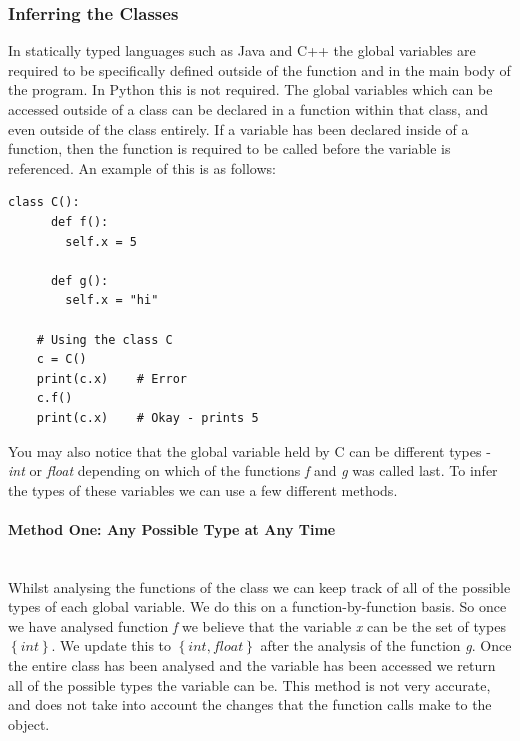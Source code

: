 \documentclass[12pt, titlepage]{article}
\begin{document}
\subsubsection{Inferring the Classes}
In statically typed languages such as Java and C++ the global variables are required to be specifically defined outside of the function and in the main body of the program. In Python this is not required. The global variables which can be accessed outside of a class can be declared in a function within that class, and even outside of the class entirely. If a variable has been declared inside of a function, then the function is required to be called before the variable is referenced. An example of this is as follows:
\begin{lstlisting}[mathescape]
    class C():
      def f():
        self.x = 5
		
      def g():
        self.x = "hi"
        
    # Using the class C
    c = C()
    print(c.x)    # Error
    c.f()
    print(c.x)    # Okay - prints 5
\end{lstlisting}
You may also notice that the global variable held by C can be different types - \textit{int} or \textit{float} depending on which of the functions \textit{f} and \textit{g} was called last. To infer the types of these variables we can use a few different methods.

\paragraph{Method One: Any Possible Type at Any Time}\mbox{}\\
Whilst analysing the functions of the class we can keep track of all of the possible types of each global variable. We do this on a function-by-function basis. So once we have analysed function \textit{f} we believe that the variable \textit{x} can be the set of types $\left\{ {int}\right\}$. We update this to $\left\{ {int, float}\right\}$ after the analysis of the function \textit{g}. Once the entire class has been analysed and the variable has been accessed we return all of the possible types the variable can be. This method is not very accurate, and does not take into account the changes that the function calls make to the object.
\end{document}
